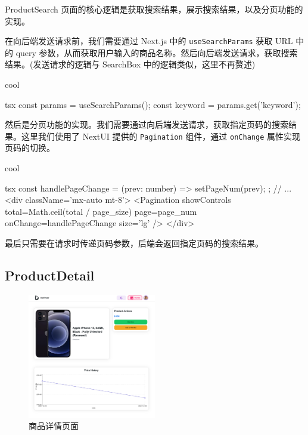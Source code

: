 ProductSearch 页面的核心逻辑是获取搜索结果，展示搜索结果，以及分页功能的实现。

在向后端发送请求前，我们需要通过 Next.js 中的 \texttt{useSearchParams} 获取 URL 中的 query 参数，从而获取用户输入的商品名称。然后向后端发送请求，获取搜索结果。(发送请求的逻辑与 SearchBox 中的逻辑类似，这里不再赘述)

\begin{codebox}{}{cool}
\begin{amzcode}{tsx}
const params = useSearchParams();
const keyword = params.get('keyword');
\end{amzcode}
\end{codebox}

然后是分页功能的实现。我们需要通过向后端发送请求，获取指定页码的搜索结果。这里我们使用了 NextUI 提供的 \texttt{Pagination} 组件，通过 \texttt{onChange} 属性实现页码的切换。

\begin{codebox}{}{cool}
\begin{amzcode}{tsx}
const handlePageChange = (prev: number) => {
    setPageNum(prev);
};
// ...
<div className='mx-auto mt-8'>
    <Pagination showControls total={Math.ceil(total / page_size)} page={page_num} onChange={handlePageChange} size='lg' />
</div>
\end{amzcode}
\end{codebox}

最后只需要在请求时传递页码参数，后端会返回指定页码的搜索结果。

\subsection{ProductDetail}

\begin{figure}[H]
\centering
\includegraphics[width=0.5\textwidth]{assets/report/product_page.png}
\caption{商品详情页面}
\end{figure}

